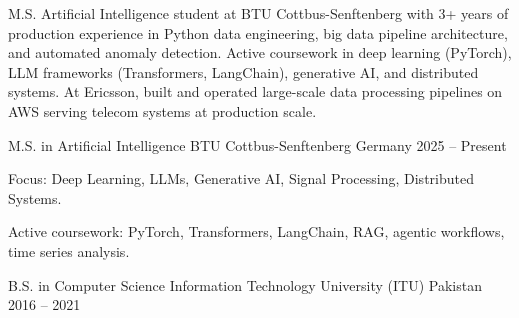 \documentclass[11pt, a4paper]{awesome-cv}
\begin{document}
\makecvheader[C]


\begin{cvparagraph}
M.S. Artificial Intelligence student at BTU Cottbus-Senftenberg with 3+ years of production experience in Python data engineering, big data pipeline architecture, and automated anomaly detection. Active coursework in deep learning (PyTorch), LLM frameworks (Transformers, LangChain), generative AI, and distributed systems. At Ericsson, built and operated large-scale data processing pipelines on AWS serving telecom systems at production scale.
\end{cvparagraph}


\begin{cventries}
\cventry
{M.S. in Artificial Intelligence}
{BTU Cottbus-Senftenberg}
{Germany}
{2025 -- Present}
{
\begin{cvitems}
\item {Focus: Deep Learning, LLMs, Generative AI, Signal Processing, Distributed Systems.}
\item {Active coursework: PyTorch, Transformers, LangChain, RAG, agentic workflows, time series analysis.}
\end{cvitems}
}

\cventry
{B.S. in Computer Science}
{Information Technology University (ITU)}
{Pakistan}
{2016 -- 2021}
{}
\end{cventries}

\end{document}
